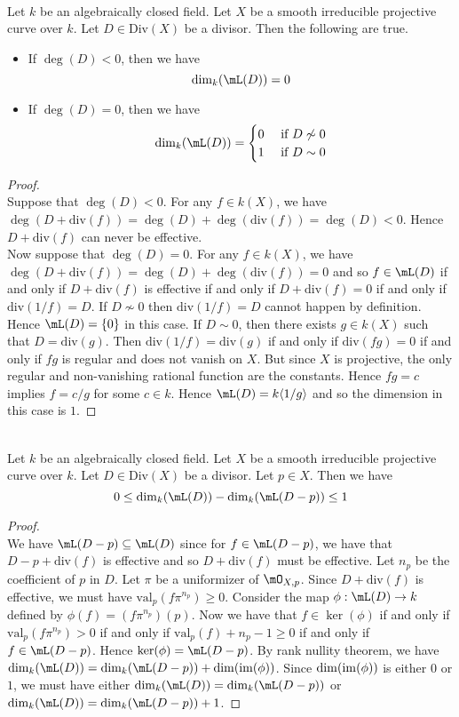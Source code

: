\documentclass[a4paper]{article}
\begin{document}
\begin{prp}{}{}\\
Let $k$ be an algebraically closed field. Let $X$ be a smooth irreducible projective curve over $k$. Let $D\in\text{Div}(X)$ be a divisor. Then the following are true. 
\begin{itemize}
\item If $\deg(D)<0$, then we have $$\dim_k(\mL(D))=0$$
\item If $\deg(D)=0$, then we have $$\dim_k(\mL(D))=\begin{cases}
0 & \text{ if }D\not\sim0\\
1 & \text{ if }D\sim 0
\end{cases}$$
\end{itemize}
\begin{proof}\\
Suppose that $\deg(D)<0$. For any $f\in k(X)$, we have $\deg(D+\text{div}(f))=\deg(D)+\deg(\text{div}(f))=\deg(D)<0$. Hence $D+\text{div}(f)$ can never be effective. \\

Now suppose that $\deg(D)=0$. For any $f\in k(X)$, we have $\deg(D+\text{div}(f))=\deg(D)+\deg(\text{div}(f))=0$ and so $f\in\mL(D)$ if and only if $D+\text{div}(f)$ is effective if and only if $D+\text{div}(f)=0$ if and only if $\text{div}(1/f)=D$. If $D\not\sim0$ then $\text{div}(1/f)=D$ cannot happen by definition. Hence $\mL(D)=\{0\}$ in this case. If $D\sim 0$, then there exists $g\in k(X)$ such that $D=\text{div}(g)$. Then $\text{div}(1/f)=\text{div}(g)$ if and only if $\text{div}(fg)=0$ if and only if $fg$ is regular and does not vanish on $X$. But since $X$ is projective, the only regular and non-vanishing rational function are the constants. Hence $fg=c$ implies $f=c/g$ for some $c\in k$. Hence $\mL(D)=k\langle 1/g\rangle$ and so the dimension in this case is $1$. 
\end{proof}
\end{prp}

\begin{lmm}{}{}\\
Let $k$ be an algebraically closed field. Let $X$ be a smooth irreducible projective curve over $k$. Let $D\in\text{Div}(X)$ be a divisor. Let $p\in X$. Then we have $$0\leq\dim_k(\mL(D))-\dim_k(\mL(D-p))\leq 1$$
\begin{proof}\\
We have $\mL(D-p)\subseteq\mL(D)$ since for $f\in\mL(D-p)$, we have that $D-p+\text{div}(f)$ is effective and so $D+\text{div}(f)$ must be effective. Let $n_p$ be the coefficient of $p$ in $D$. Let $\pi$ be a uniformizer of $\mO_{X,p}$. Since $D+\text{div}(f)$ is effective, we must have $\text{val}_p(f\pi^{n_p})\geq 0$. Consider the map $\phi:\mL(D)\to k$ defined by $\phi(f)=(f\pi^{n_p})(p)$. Now we have that $f\in\ker(\phi)$ if and only if $\text{val}_p(f\pi^{n_p})>0$ if and only if $\text{val}_p(f)+n_p-1\geq 0$ if and only if $f\in\mL(D-p)$. Hence $\ker(\phi)=\mL(D-p)$. By rank nullity theorem, we have $\dim_k(\mL(D))=\dim_k(\mL(D-p))+\dim(\im(\phi))$. Since $\dim(\operatorname{im}(\phi))$ is either $0$ or $1$, we must have either $\dim_k(\mL(D))=\dim_k(\mL(D-p))$ or $\dim_k(\mL(D))=\dim_k(\mL(D-p))+1$. 
\end{proof}
\end{lmm}
\end{document}
